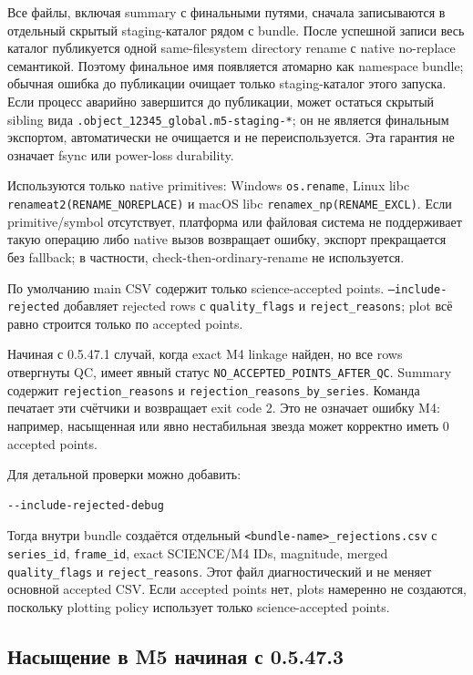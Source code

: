 Все файлы, включая summary с финальными путями, сначала записываются в отдельный скрытый
staging-каталог рядом с bundle. После успешной записи весь каталог публикуется одной
same-filesystem directory rename с native no-replace семантикой. Поэтому финальное имя
появляется атомарно как namespace bundle; обычная ошибка до публикации очищает только
staging-каталог этого запуска. Если процесс аварийно завершится до публикации, может
остаться скрытый sibling вида \texttt{.object\_12345\_global.m5-staging-*}; он не является
финальным экспортом, автоматически не очищается и не переиспользуется. Эта гарантия не
означает fsync или power-loss durability.

Используются только native primitives: Windows \texttt{os.rename}, Linux libc
\texttt{renameat2(RENAME\_NOREPLACE)} и macOS libc \texttt{renamex\_np(RENAME\_EXCL)}.
Если primitive/symbol отсутствует, платформа или файловая система не поддерживает такую
операцию либо native вызов возвращает ошибку, экспорт прекращается без fallback; в
частности, check-then-ordinary-rename не используется.

По умолчанию main CSV содержит только science-accepted points. \texttt{--include-rejected} добавляет rejected rows с \texttt{quality\_flags} и \texttt{reject\_reasons}; plot всё равно строится только по accepted points.

Начиная с 0.5.47.1 случай, когда exact M4 linkage найден, но все rows отвергнуты QC, имеет явный статус \texttt{NO\_ACCEPTED\_POINTS\_AFTER\_QC}. Summary содержит \texttt{rejection\_reasons} и \texttt{rejection\_reasons\_by\_series}. Команда печатает эти счётчики и возвращает exit code 2. Это не означает ошибку M4: например, насыщенная или явно нестабильная звезда может корректно иметь 0 accepted points.

Для детальной проверки можно добавить:

\begin{lstlisting}
--include-rejected-debug
\end{lstlisting}

Тогда внутри bundle создаётся отдельный \texttt{<bundle-name>\_rejections.csv} с \texttt{series\_id}, \texttt{frame\_id}, exact SCIENCE/M4 IDs, magnitude, merged \texttt{quality\_flags} и \texttt{reject\_reasons}. Этот файл диагностический и не меняет основной accepted CSV. Если accepted points нет, plots намеренно не создаются, поскольку plotting policy использует только science-accepted points.

\subsection{Насыщение в M5 начиная с 0.5.47.3}

